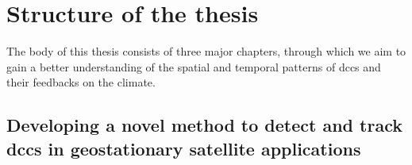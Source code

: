 




\section{Structure of the thesis}

The body of this thesis consists of three major chapters, through which we aim to gain a better understanding of the spatial and temporal patterns of \acrshort{dcc}s and their feedbacks on the climate.


\subsection{Developing a novel method to detect and track \acrshort{dcc}s in geostationary satellite applications}

